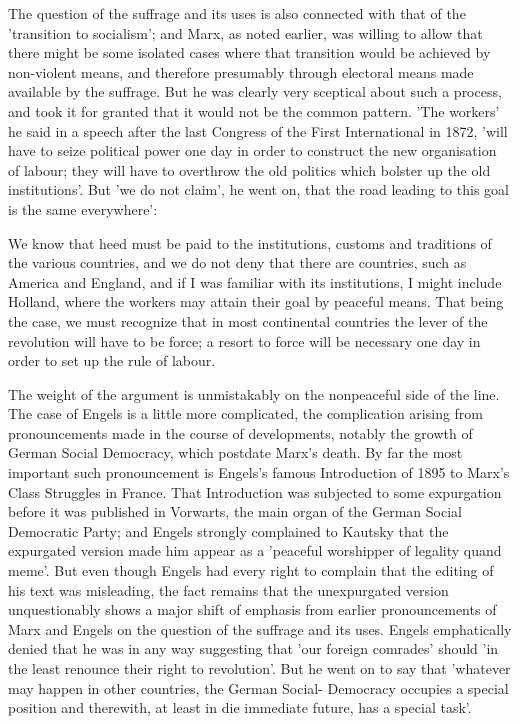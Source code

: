 The question of the suffrage and its uses is also connected with that of the 'transition to socialism'; and Marx, as noted earlier, was willing to allow that there might be some isolated cases where that transition would be achieved by non-violent means, and therefore presumably through electoral means made available by the suffrage. But he was clearly very sceptical about such a process, and took it for granted that it would not be the common pattern. 'The workers' he said in a speech after the last Congress of the First International in 1872, 'will have to seize political power one day in order to construct the new organisation of labour; they will have to overthrow the old politics which bolster up the old institutions'. But 'we do not claim', he went on, that the road leading to this goal is the same everywhere':
\begin{displayquote}
    We know that heed must be paid to the institutions, customs and traditions of the various countries, and we do not deny that there are countries, such as America and England, and if I was familiar with its institutions, I might include Holland, where the workers may attain their goal by peaceful means. That being the case, we must recognize that in most continental countries the lever of the revolution will have to be force; a resort to force will be necessary one day in order to set up the rule of labour.
\end{displayquote}

The weight of the argument is unmistakably on the nonpeaceful side of the line. The case of Engels is a little more complicated, the complication arising from pronouncements made in the course of developments, notably the growth of German Social Democracy, which postdate Marx's death. By far the most important such pronouncement is Engels's famous Introduction of 1895 to Marx's Class Struggles in France. That Introduction was subjected to some expurgation before it was published in Vorwarts, the main organ of the German Social Democratic Party; and Engels strongly complained to Kautsky that the expurgated version made him appear as a 'peaceful worshipper of legality quand meme'. But even though Engels had every right to complain that the editing of his text was misleading, the fact remains that the unexpurgated version unquestionably shows a major shift of emphasis from earlier pronouncements of Marx and Engels on the question of the suffrage and its uses. Engels emphatically denied that he was in any way suggesting that 'our foreign comrades' should 'in the least renounce their right to revolution'. But he went on to say that 'whatever may happen in other countries, the German Social- Democracy occupies a special position and therewith, at least in die immediate future, has a special task'.

